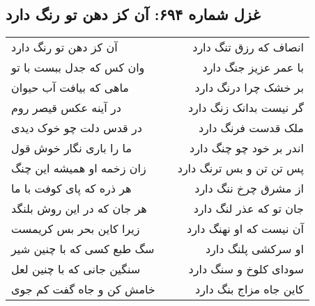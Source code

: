 \begin{center}
\section*{غزل شماره ۶۹۴: آن کز دهن تو رنگ دارد}
\label{sec:0694}
\begin{longtable}{l p{0.5cm} r}
آن کز دهن تو رنگ دارد
&&
انصاف که رزق تنگ دارد
\\
وان کس که جدل ببست با تو
&&
با عمر عزیز جنگ دارد
\\
ماهی که بیافت آب حیوان
&&
بر خشک چرا درنگ دارد
\\
در آینه عکس قیصر روم
&&
گر نیست بدانک زنگ دارد
\\
در قدس دلت چو خوک دیدی
&&
ملک قدست فرنگ دارد
\\
ما را باری نگار خوش قول
&&
اندر بر خود چو چنگ دارد
\\
زان زخمه او همیشه این چنگ
&&
پس تن تن و بس ترنگ دارد
\\
هر ذره که پای کوفت با ما
&&
از مشرق چرخ ننگ دارد
\\
هر جان که در این روش بلنگد
&&
جان تو که عذر لنگ دارد
\\
زیرا کاین بحر بس کریمست
&&
آن نیست که او نهنگ دارد
\\
سگ طبع کسی که با چنین شیر
&&
او سرکشی پلنگ دارد
\\
سنگین جانی که با چنین لعل
&&
سودای کلوخ و سنگ دارد
\\
خامش کن و جاه گفت کم جوی
&&
کاین جاه مزاج بنگ دارد
\\
\end{longtable}
\end{center}
